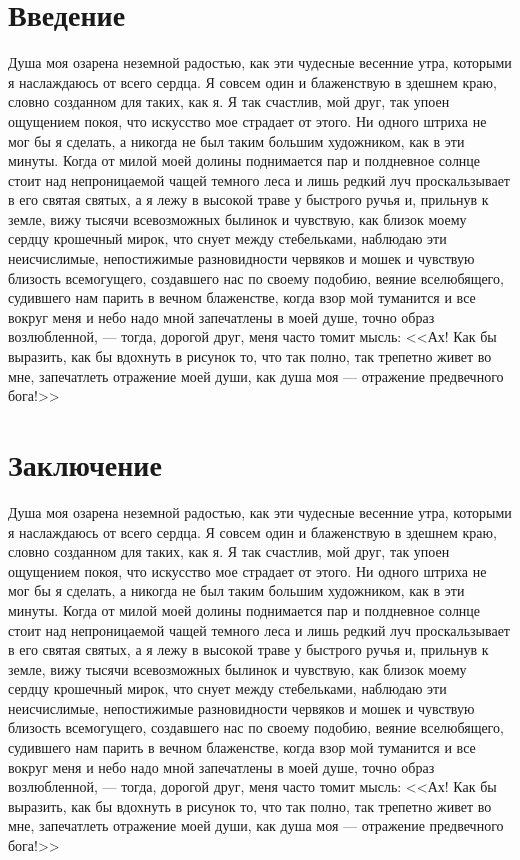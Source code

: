 \documentclass[journal]{INJOITrus}
\begin{document}
\section{Введение}
\label{sec:intro}
Душа моя озарена неземной радостью, как эти чудесные весенние утра, которыми я наслаждаюсь от всего сердца. Я совсем один и блаженствую в здешнем краю, словно созданном для таких, как я. Я так счастлив, мой друг, так упоен ощущением покоя, что искусство мое страдает от этого. Ни одного штриха не мог бы я сделать, а никогда не был таким большим художником, как в эти минуты. Когда от милой моей долины поднимается пар и полдневное солнце стоит над непроницаемой чащей темного леса и лишь редкий луч проскальзывает в его святая святых, а я лежу в высокой траве у быстрого ручья и, прильнув к земле, вижу тысячи всевозможных былинок и чувствую, как близок моему сердцу крошечный мирок, что снует между стебельками, наблюдаю эти неисчислимые, непостижимые разновидности червяков и мошек и чувствую близость всемогущего, создавшего нас по своему подобию, веяние вселюбящего, судившего нам парить в вечном блаженстве, когда взор мой туманится и все вокруг меня и небо надо мной запечатлены в моей душе, точно образ возлюбленной, --- тогда, дорогой друг, меня часто томит мысль: <<Ах! Как бы выразить, как бы вдохнуть в рисунок то, что так полно, так трепетно живет во мне, запечатлеть отражение моей души, как душа моя --- отражение предвечного бога!>>

\section{Заключение}
\label{sec:conclusion}
Душа моя озарена неземной радостью, как эти чудесные весенние утра, которыми я наслаждаюсь от всего сердца. Я совсем один и блаженствую в здешнем краю, словно созданном для таких, как я. Я так счастлив, мой друг, так упоен ощущением покоя, что искусство мое страдает от этого. Ни одного штриха не мог бы я сделать, а никогда не был таким большим художником, как в эти минуты. Когда от милой моей долины поднимается пар и полдневное солнце стоит над непроницаемой чащей темного леса и лишь редкий луч проскальзывает в его святая святых, а я лежу в высокой траве у быстрого ручья и, прильнув к земле, вижу тысячи всевозможных былинок и чувствую, как близок моему сердцу крошечный мирок, что снует между стебельками, наблюдаю эти неисчислимые, непостижимые разновидности червяков и мошек и чувствую близость всемогущего, создавшего нас по своему подобию, веяние вселюбящего, судившего нам парить в вечном блаженстве, когда взор мой туманится и все вокруг меня и небо надо мной запечатлены в моей душе, точно образ возлюбленной, --- тогда, дорогой друг, меня часто томит мысль: <<Ах! Как бы выразить, как бы вдохнуть в рисунок то, что так полно, так трепетно живет во мне, запечатлеть отражение моей души, как душа моя --- отражение предвечного бога!>> \cite{goethe}
\end{document}
